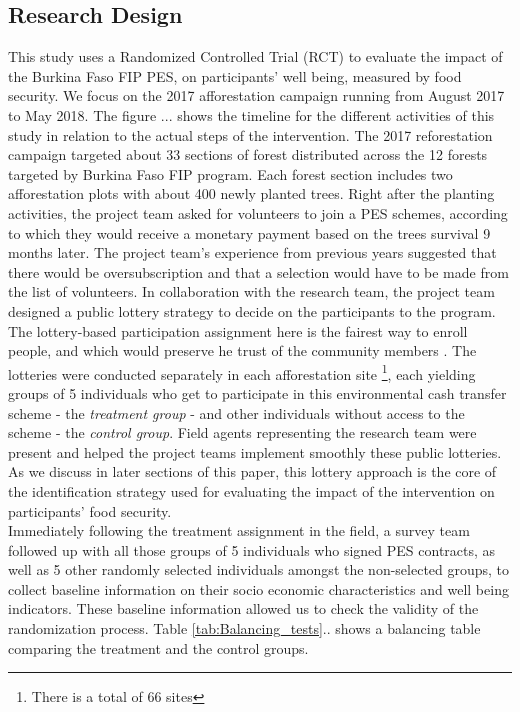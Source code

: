 \documentclass[preprint,12pt]{elsarticle}
\begin{document}
\subsection{Research Design}
This study uses a Randomized Controlled Trial (RCT) to evaluate the impact of the Burkina Faso FIP PES, on participants' well being, measured by food security. We focus on the 2017 afforestation campaign running from August 2017 to May 2018. The figure ... shows the timeline for the different activities of this study in relation to the actual steps of the intervention. The 2017 reforestation campaign targeted about 33 sections of forest distributed across the 12 forests targeted by Burkina Faso FIP program. Each forest section includes two afforestation plots with about 400 newly planted trees. Right after the planting activities, the project team asked for volunteers to join a PES schemes, according to which they would receive a monetary payment based on the trees survival 9 months later. The project team's experience from previous years suggested that there would be oversubscription and that a selection would have to be made from the list of volunteers. In collaboration with the research team, the project team designed a public lottery strategy to decide on the participants to the program. The lottery-based participation assignment here is the fairest way to enroll people, and which would preserve he trust of the community members \citet{gueron2017politics}. The lotteries were conducted separately in each afforestation site \footnote{There is a total of 66 sites }, each yielding groups of 5 individuals who get to participate in this environmental cash transfer scheme - the \textit{treatment group} - and other individuals without access to the scheme - the \textit{control group}. Field agents representing the research team were present and helped the project teams implement smoothly these public lotteries. As we discuss in later sections of this paper, this lottery approach is the core of the identification strategy used for evaluating the impact of the intervention on participants' food security. \\

Immediately following the treatment assignment in the field, a survey team followed up with all those groups of 5 individuals who signed PES contracts, as well as 5 other randomly selected individuals amongst the non-selected groups, to collect baseline information on their socio economic characteristics and well being indicators.  These baseline information allowed us to check the validity of the randomization process. Table \ref*{tab:Balancing_tests}.. shows a balancing table comparing the treatment and the control groups. 
\end{document}
